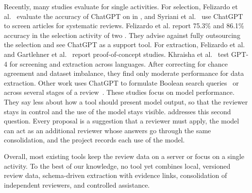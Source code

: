 Recently, many studies evaluate \LLMs for single \SLR activities.
For selection, Felizardo et al.~\cite{felizardo2024chatgpt} evaluate the accuracy of ChatGPT on \SLRs in \SE, and Syriani et al.~\cite{syriani2024screening} use ChatGPT to screen articles for systematic reviews.
Felizardo et al. report 75.3\% and 86.1\% accuracy in the selection activity of two \SLRs.
They advise against fully outsourcing the selection and see ChatGPT as a support tool.
For extraction, Felizardo et al.~\cite{felizardo2024dataextraction} and Gartlehner et al.~\cite{gartlehner2024data} report proof-of-concept studies.
Khraisha et al.~\cite{khraisha2024llm} test GPT-4 for screening and extraction across languages.
After correcting for chance agreement and dataset imbalance, they find only moderate performance for data extraction.
Other work uses ChatGPT to formulate Boolean search queries~\cite{wang2023chatgpt} or across several stages of a review~\cite{alshami2023harnessing}.
These studies focus on model performance.
They say less about how a tool should present model output, so that the reviewer stays in control and the use of the model stays visible.
\SaiLoR addresses this second question.
Every proposal is a suggestion that a reviewer must apply, the model can act as an additional reviewer whose answers go through the same consolidation, and the project records each use of the model.

Overall, most existing tools keep the review data on a server or focus on a single activity.
To the best of our knowledge, no tool yet combines local, versioned review data, schema-driven extraction with evidence links, consolidation of independent reviewers, and controlled \LLM assistance.
